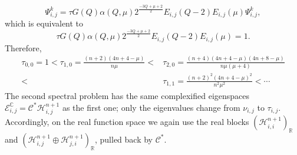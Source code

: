 \documentclass[11pt]{article}
\begin{document}
\begin{equation*}
 \Psi_{i,j}^k=\tau G(Q)\alpha(Q,\mu)2^{\frac{-3Q+\mu+2}{2}}E_{i,j}(Q-2)E_{i,j}(\mu) \Psi_{i,j}^k,
\end{equation*}
which is equivalent to
\begin{equation*}
 \tau G(Q)\alpha(Q,\mu)2^{\frac{-3Q+\mu+2}{2}}E_{i,j}(Q-2)E_{i,j}(\mu)=1.
\end{equation*}
Therefore,
\begin{align}\label{eig2}
 \tau_{0,0}=1<\tau_{1,0}=\frac{(n+2)(4n+4-\mu)}{n\mu}<&\tau_{2,0}=\frac{(n+4)(4n+4-\mu)(4n+8-\mu)}{n\mu(\mu+4)}
\nonumber \\ <&\tau_{1,1}=\frac{(n+2)^2(4n+4-\mu)^2}{n^2\mu^2}<\cdots
\end{align}
{The second spectral problem has the same complexified eigenspaces $\mathcal E_{i,j}^{\mathbb C}=\mathcal C^*\mathcal H_{i,j}^{n+1}$ as the first one; only the eigenvalues change from $\nu_{i,j}$ to $\tau_{i,j}$. Accordingly, on the real function space we again use the real blocks $(\mathcal H_{i,i}^{n+1})_{\mathbb R}$ and $(\mathcal H_{i,j}^{n+1}\oplus\mathcal H_{j,i}^{n+1})_{\mathbb R}$, pulled back by $\mathcal C^*$.}
\end{document}
